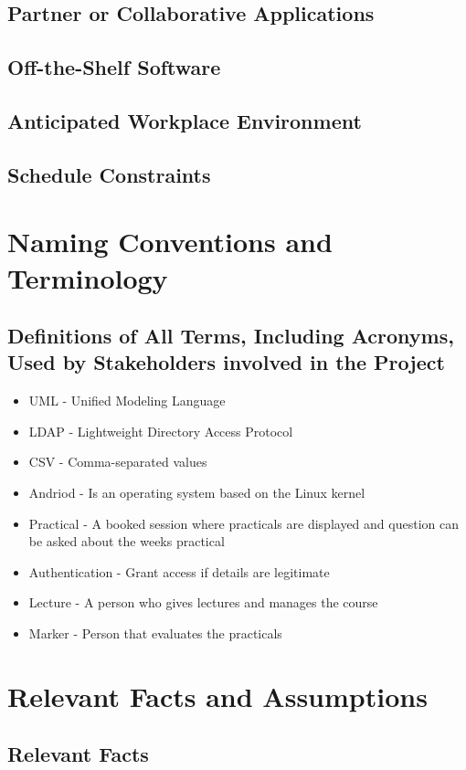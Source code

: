 \documentclass[12pt,a4paper]{article}
\begin{document}
\subsection{Partner or Collaborative Applications}
\subsection{Off-the-Shelf Software}
\subsection{Anticipated Workplace Environment}
\subsection{Schedule Constraints}
\pagebreak
\section{Naming Conventions and Terminology}
\subsection{Definitions of All Terms, Including Acronyms, Used by Stakeholders involved in the Project}
\begin{itemize}
\item UML - Unified Modeling Language
\item LDAP - Lightweight Directory Access Protocol
\item CSV - Comma-separated values
\item Andriod - Is an operating system based on the Linux kernel
\item Practical - A booked session where practicals are displayed and question can be asked about the weeks practical
\item Authentication - Grant access if details are legitimate
\item Lecture - A person who gives lectures and manages the course
\item Marker - Person that evaluates the practicals
\end{itemize}
\pagebreak
\section{Relevant Facts and Assumptions}
\subsection{Relevant Facts}
\end{document}
